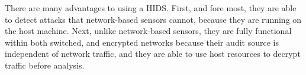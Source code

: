 \documentclass{acm_proc_article-sp}
\begin{document}
    		There are many advantages to using a HIDS. First, and fore most, they are able to detect attacks that network-based sensors cannot, because they are running on the host machine. Next, unlike network-based sensors, they are fully functional within both switched, and encrypted networks because their audit source is independent of network traffic, and they are able to use host resources to decrypt traffic before analysis.
    
\end{document}
